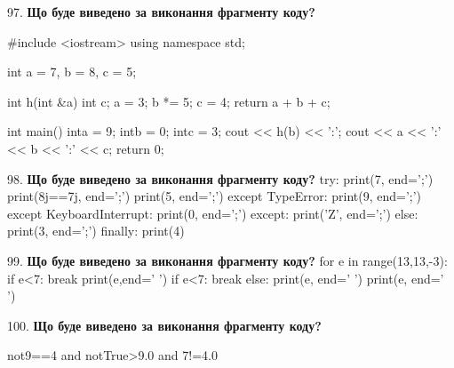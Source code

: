 \documentclass[11pt]{article}
\begin{document}
97. \textbf{Що буде виведено за виконання фрагменту коду?}

#include <iostream>
using namespace std;

int a = 7, b = 8, c = 5;

int h(int &a){
int c;    a = 3;
    b *= 5;
    c = 4;
    return a + b + c;
}

int main(){
    inta = 9;
    intb = 0;
    intc = 3;
    cout << h(b) << ':';
    cout << a << ':' << b << ':' << c;
    return 0; 
}
\par\vspace{5mm}

98. \textbf{Що буде виведено за виконання фрагменту коду?}
try:
    print(7, end=';')
    print(8j==7j, end=';')
    print(5, end=';')
except TypeError:
    print(9, end=';')
except KeyboardInterrupt:
    print(0, end=';')
except:
    print('Z', end=';')
else:
    print(3, end=';')
finally:
    print(4)
\par\vspace{5mm}

99. \textbf{Що буде виведено за виконання фрагменту коду?}
for e in range(13,13,-3):
    if e<7:
        break
        print(e,end=' ')
    if e<7:
        break
else:
    print(e, end=' ')
print(e, end=' ')
\par\vspace{5mm}

100. \textbf{Що буде виведено за виконання фрагменту коду?}

not9==4 and notTrue>9.0 and 7!=4.0
\par\vspace{5mm}

\newpage
\end{document}
